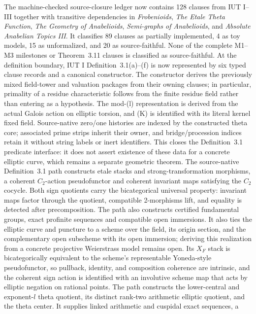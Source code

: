 \documentclass[11pt]{article}
\newcommand{\IUT}{IUT}
\theoremstyle{plain}
\theoremstyle{definition}
\theoremstyle{remark}
\begin{document}
The machine-checked source-closure ledger now contains 128 clauses from
\IUT{} I--III together with transitive dependencies in \emph{Frobenioids},
\emph{The Etale Theta Function}, \emph{The Geometry of Anabelioids},
\emph{Semi-graphs of Anabelioids}, and
\emph{Absolute Anabelian Topics III}.
It classifies 89 clauses as partially implemented, 4 as toy models, 15 as
unformalized, and 20 as source-faithful.  None of the complete M1--M3
milestones or Theorem~3.11 clauses is classified as source-faithful.
At the definition boundary, IUT{} I Definition~3.1(a)--(f) is now represented
by six typed clause records and a canonical constructor.  The constructor
derives the previously mixed field-tower and valuation packages from their
owning clauses; in particular, primality of a residue characteristic follows
from the finite residue field rather than entering as a hypothesis.  The
mod-(l) representation is derived from the actual Galois action on elliptic
torsion, and (K) is identified with its literal kernel fixed field.
Source-native zero/one histories are indexed by the constructed theta core;
associated prime strips inherit their owner, and bridge/procession indices
retain it without string labels or inert identifiers.  This closes the
Definition~3.1 predicate interface: it does not assert existence of these data
for a concrete elliptic curve, which remains a separate geometric theorem.
The source-native Definition~3.1 path constructs etale stacks and
strong-transformation morphisms, a coherent \(C_2\)-action pseudofunctor and
coherent invariant maps satisfying the \(C_2\) cocycle.  Both sign quotients
carry the bicategorical universal property: invariant maps factor through the
quotient, compatible 2-morphisms lift, and equality is detected after
precomposition.  The path also constructs certified fundamental groups, exact
profinite sequences and compatible open immersions.  It also ties the elliptic curve and
puncture to a scheme over the field, its origin section, and the complementary
open subscheme with its open immersion; deriving this realization from a
concrete projective Weierstrass model remains open.  Its \(X_F\) stack is
bicategorically equivalent to the scheme's representable Yoneda-style
pseudofunctor, so pullback, identity, and composition coherence are intrinsic,
and the coherent
sign action is identified with an involutive scheme map that acts by elliptic
negation on rational points.  The path constructs the
lower-central and exponent-\(l\)
theta quotient, its distinct rank-two arithmetic elliptic quotient, and the
theta center.  It supplies linked arithmetic and cuspidal exact sequences, a
\end{document}
